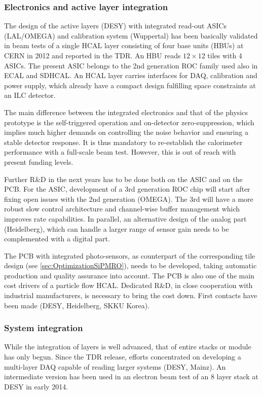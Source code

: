 \subsubsection{Electronics and active layer integration}

The design of the active layers (DESY) with integrated read-out ASICs (LAL/OMEGA) and calibration system (Wuppertal) has been basically validated in beam tests of a single HCAL layer consisting of four base units (HBUs) at CERN in 2012 and reported in the TDR. An HBU reads $12 \times 12$ tiles with 4 ASICs. The present ASIC belongs to the 2nd generation ROC family used also in ECAL and SDHCAL. An HCAL layer carries interfaces for DAQ, calibration and power supply, which already have a compact design fulfilling space constraints at an ILC detector.

The main difference between the integrated electronics and that of the physics prototype is the self-triggered operation and on-detector zero-suppression, which implies much higher demands on controlling the noise behavior and ensuring a stable detector response. It is thus mandatory to re-establish the calorimeter performance with a full-scale beam test. However, this is out of reach with present funding levels.

Further R\&D in the next years has to be done both on the ASIC and on the PCB. For the ASIC, development of a 3rd generation ROC chip will start after fixing open issues with the 2nd generation (OMEGA). The 3rd will have a more robust slow control architecture and channel-wise buffer management which improves rate capabilities. In parallel, an alternative design of the analog part (Heidelberg), which can handle a larger range of sensor gain needs to be complemented with a digital part.

The PCB with integrated photo-sensors, as counterpart of the corresponding tile design (see \ref{sec:OptimizationSiPMRO}), needs to be developed, taking automatic production and quality assurance into account. The PCB is also one of the main cost drivers of a particle flow HCAL. Dedicated R\&D, in close cooperation with industrial manufacturers, is necessary to bring the cost down. First contacts have been made (DESY, Heidelberg, SKKU Korea).

\subsubsection{System integration}

While the integration of layers is well advanced, that of entire stacks or module has only begun. Since the TDR release, efforts concentrated on developing a multi-layer DAQ capable of reading larger systems (DESY, Mainz). An intermediate version has been used in an electron beam test of an 8 layer stack at DESY in early 2014.

